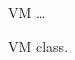 \begin{figure}[H]
\centering
\begin{class}{VM}
\dots
\end{class}
\caption{VM class.}
\label{oz_vm_class}
\end{figure}